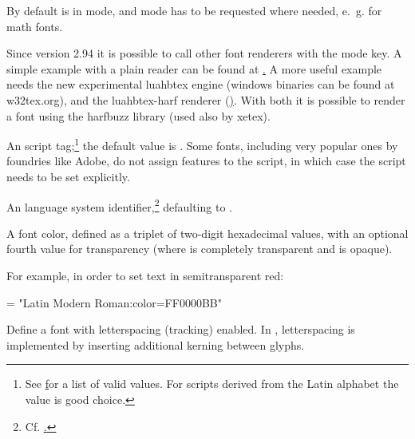          By default  is in 
         mode, and  mode has to be requested where needed,
         e.~g. for math fonts.

         Since version 2.94 it is possible to call other font renderers with the mode key. A simple example with a plain reader can be found at \hyperlink{https://github.com/u-fischer/luaotfload/pull/26\#issuecomment-437716326}.
         A more useful example needs the new experimental luahbtex engine (windows binaries can be found at w32tex.org), and the luahbtex-harf renderer (\hyperlink{https://github.com/khaledhosny/luahbtex-harf}). With both it is possible to render a font using the harfbuzz library (used also by xetex).


  \endaltitem

   \label{script-tag}
         An \OpenType script tag;\footnote{%
           See \hyperlink {http://www.microsoft.com/typography/otspec/scripttags.htm}
           for a list of valid values.
           For scripts derived from the Latin alphabet the value
            is good choice.
         }
         the default value is .
         Some fonts, including very popular ones by foundries like Adobe,
         do not assign features to the  script, in
         which case the script needs to be set explicitly.
  \endaltitem

         An \OpenType language system identifier,\footnote{%
           Cf. \hyperlink {http://www.microsoft.com/typography/otspec/languagetags.htm}.
         }
         defaulting to .
  \endaltitem

         A font color, defined as a triplet of two-digit hexadecimal
          values, with an optional fourth value for
         transparency
         (where  is completely transparent and
          is opaque).

         For example, in order to set text in semitransparent red:

         \beginlisting
      \font \test = "Latin Modern Roman:color=FF0000BB"
         \endlisting
  \endaltitem

  \label{p:letterspace}
         Define a font with letterspacing (tracking) enabled.
         In , letterspacing is implemented by
         inserting additional kerning between glyphs.

